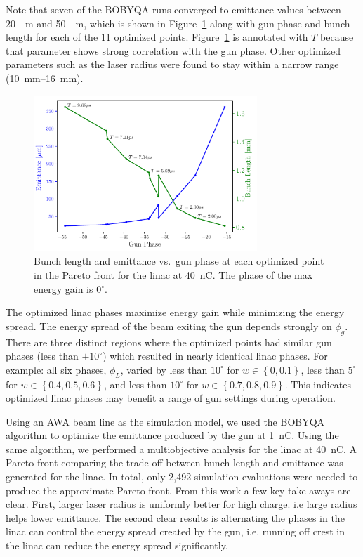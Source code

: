 Note that seven of the BOBYQA runs converged to emittance values
between \SI{20}{\mu m} and \SI{50}{\mu m}, which is shown in Figure~\ref{fig:trade} 
along with gun phase and bunch length for each of the 11
optimized points. Figure~\ref{fig:trade} is annotated with $T$ because that parameter 
shows strong correlation with the gun phase. Other optimized parameters such as the laser radius were found to stay within a 
narrow range (\SIrange{10}{16}{mm}).  
\begin{figure}%
	\begin{center}
		\includegraphics[width=0.75\textwidth]{images/THPAB155f3}
		\caption{\label{fig:trade}Bunch length and emittance vs.~gun phase at each optimized point in the Pareto front for the linac at \SI{40}{nC}. The phase of the max energy gain is 0$^{\circ}$.}
	\end{center}
\end{figure}


The optimized linac phases maximize energy gain while minimizing the energy spread.
The energy spread of the beam exiting the gun depends strongly on $\phi_g$.
There are three distinct regions where the optimized points had similar gun phases 
(less than $\pm10^{\circ}$) which resulted in nearly identical linac phases. For example:  
all six phases, $\phi_L$, varied by less than $10^{\circ}$ for $w \in \left\{ 0, 0.1\right\}$,
less than $5^{\circ}$ for $w \in \left\{ 0.4, 0.5, 0.6\right\}$, 
and less than $10^{\circ}$ for $w \in \left\{ 0.7, 0.8, 0.9\right\}$.
This indicates optimized linac phases may benefit a range of gun settings during operation. 


Using an AWA beam line as the simulation model, we used the BOBYQA algorithm 
to optimize the emittance produced by the gun at \SI{1}{nC}.
Using the same algorithm, we performed a multiobjective analysis for the linac at \SI{40}{nC}. 
A Pareto front comparing the trade-off between bunch length and emittance was generated for the linac. 
In total, only 2,492 simulation evaluations were needed to produce the approximate Pareto front.
From this work a few key take aways are clear. First, larger laser radius
is uniformly better for high charge. i.e large radius helps lower emittance.
The second clear results is alternating the phases in the linac can control 
the energy spread created by the gun, i.e. running off crest in the linac 
can reduce the energy spread significantly.

